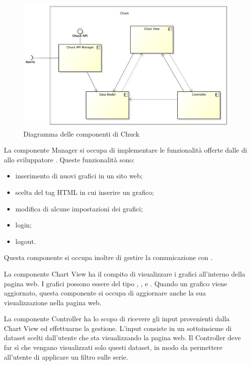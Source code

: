 	\begin{figure}[H]\centering
        \includegraphics[width=\textwidth]{SpecificaTecnica/Pics/ComponentiChuck}
        \caption{Diagramma delle componenti di Chuck}
    \end{figure}
		La componente   Manager si occupa di implementare le funzionalità offerte dalle  di  allo sviluppatore . Queste funzionalità sono:
		\begin{itemize}
			\item inserimento di nuovi grafici in un sito web;
			\item scelta del tag HTML in cui inserire un grafico;
			\item modifica di alcune impostazioni dei grafici;
			\item login;
			\item logout.
		\end{itemize}
		Questa componente si occupa inoltre di gestire la comunicazione con .
		
		La componente Chart View ha il compito di visualizzare i grafici all'interno della pagina web. I grafici possono essere del tipo , ,  e . Quando un grafico viene aggiornato, questa componente si occupa di aggiornare anche la sua visualizzazione nella pagina web.

		La componente Controller ha lo scopo di ricevere gli input provenienti dalla Chart View ed effettuarne la gestione. L'input consiste in un sottoinsieme di dataset scelti dall'utente che sta visualizzando la pagina web. Il Controller deve far sì che vengano visualizzati solo questi dataset, in modo da permettere all'utente di applicare un filtro sulle serie.

